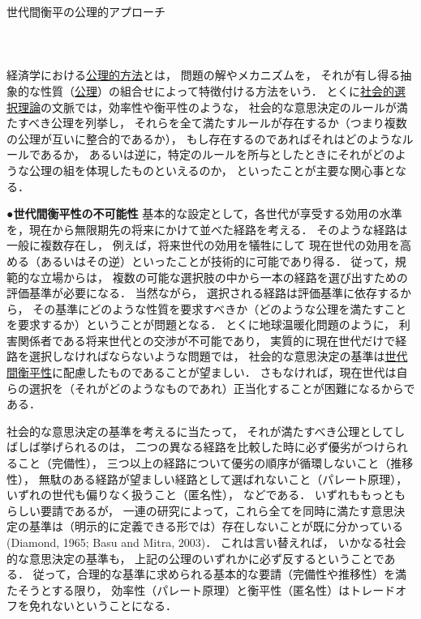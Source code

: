 \documentclass[11pt,a4paper]{article}
\begin{document}
\noindent
世代間衡平の公理的アプローチ\\
\ \\
\ \\
\ \\

経済学における\underline{公理的方法}とは，
問題の解やメカニズムを，
それが有し得る抽象的な性質（\underline{公理}）の組合せによって特徴付ける方法をいう．
とくに\underline{社会的選択理論}の文脈では，効率性や衡平性のような，
社会的な意思決定のルールが満たすべき公理を列挙し，
それらを全て満たすルールが存在するか（つまり複数の公理が互いに整合的であるか），
もし存在するのであればそれはどのようなルールであるか，
あるいは逆に，特定のルールを所与としたときにそれがどのような公理の組を体現したものといえるのか，
といったことが主要な関心事となる．

\noindent\textbf{●世代間衡平性の不可能性}\hspace{0.5em}
基本的な設定として，各世代が享受する効用の水準を，現在から無限期先の将来にかけて並べた経路を考える．
そのような経路は一般に複数存在し，
例えば，将来世代の効用を犠牲にして
現在世代の効用を高める（あるいはその逆）といったことが技術的に可能であり得る．
従って，規範的な立場からは，
複数の可能な選択肢の中から一本の経路を選び出すための評価基準が必要になる．
当然ながら，
選択される経路は評価基準に依存するから，
その基準にどのような性質を要求すべきか（どのような公理を満たすことを要求するか）ということが問題となる．
とくに地球温暖化問題のように，
利害関係者である将来世代との交渉が不可能であり，
実質的に現在世代だけで経路を選択しなければならないような問題では，
社会的な意思決定の基準は\underline{世代間衡平性}に配慮したものであることが望ましい．
さもなければ，現在世代は自らの選択を（それがどのようなものであれ）正当化することが困難になるからである．

社会的な意思決定の基準を考えるに当たって，
それが満たすべき公理としてしばしば挙げられるのは，
二つの異なる経路を比較した時に必ず優劣がつけられること（完備性），
三つ以上の経路について優劣の順序が循環しないこと（推移性），
無駄のある経路が望ましい経路として選ばれないこと（パレート原理），
いずれの世代も偏りなく扱うこと（匿名性），
などである．
いずれももっともらしい要請であるが，
一連の研究によって，これら全てを同時に満たす意思決定の基準は（明示的に定義できる形では）存在しないことが既に分かっている
(Diamond, 1965; Basu and Mitra, 2003)．
これは言い替えれば，
いかなる社会的な意思決定の基準も，
上記の公理のいずれかに必ず反するということである．
従って，合理的な基準に求められる基本的な要請（完備性や推移性）を満たそうとする限り，
効率性（パレート原理）と衡平性（匿名性）はトレードオフを免れないということになる．
\end{document}

